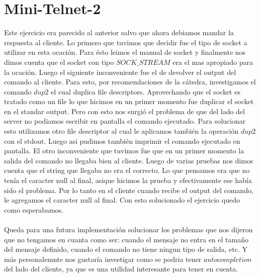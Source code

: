 \documentclass[a4paper, 10pt]{article}
\begin{document}
\section{Mini-Telnet-2}
 Este ejercicio era parecido al anterior salvo que ahora debiamos mandar la respuesta al cliente. Lo primero que tuvimos que decidir fue el tipo de socket a utilizar en esta ocaci\'on. Para \'esto leimos el manual de socket y finalmente nos dimos cuenta que el socket con tipo $SOCK\_STREAM$ era el mas apropiado para la ocaci\'on. Luego el siguiente inconveniente fue el de devolver el output del comando al cliente. Para esto, por recomendaciones de la c\'atedra, investigamos el comando $dup2$ el cual duplica file descriptors. Aprovechando que el socket es tratado como un file lo que hicimos en un primer momento fue duplicar el socket en el standar output. Pero con esto nos surgi\'o el problema de que del lado del server no podiamos escribir en pantalla el comando ejecutado. Para solucionar esto utilizamos otro file descriptor al cual le aplicamos tambi\'en la operaci\'on $dup2$ con el stdout. Luego asi pudimos tambi\'en imprimir el comando ejecutado en pantalla. El otro inconveniente que tuvimos fue que en un primer momento la salida del comando no llegaba bien al cliente. Luego de varias pruebas nos dimos cuenta que el string que llegaba no era el correcto. Lo que pensamos era que no ten\'ia el caracter null al final, asique hicimos la prueba y efectivamente ese hab\'ia sido el problema. Por lo tanto en el cliente cuando recibe el output del comando, le agregamos el caracter null al final. Con esto solucionado el ejercicio quedo como esperabamos.\\\\
 Queda para una futura implementaci\'on solucionar los problemas que nos dijeron que no tengamos en cuanta como ser: cuando el mensaje no entra en el tama\~{n}o del mensaje definido, cuando el comando no tiene ningun tipo de salida, etc. 
Y m\'as personalemnte nos gustar\'ia investigar como se podria tener $autocompletion$ del lado del cliente, ya que es una utilidad interesante para tener en cuenta.




 
 
\end{document}
